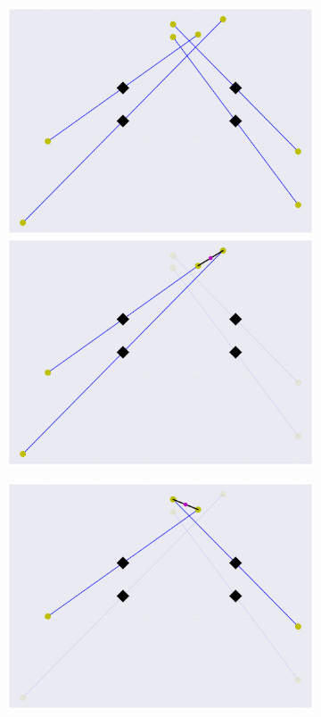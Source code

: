 \begin{figure}
    \centering
    \begin{subfigure}{0.45\textwidth}
        \includegraphics[width=0.8\linewidth]{Plots/stereo_magic_all.pdf} 
        \includegraphics[width=0.8\linewidth]{Plots/stereo_magic_2.pdf} 
    \end{subfigure}
    \begin{subfigure}{0.45\textwidth}
        \includegraphics[width=0.8\linewidth]{Plots/stereo_magic_1.pdf}

\end{subfigure}
\end{figure}
